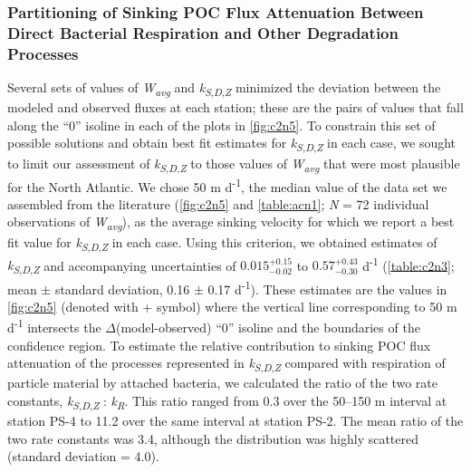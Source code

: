 \subsubsection{Partitioning of Sinking POC Flux Attenuation Between Direct Bacterial Respiration and Other Degradation Processes}
\label{sssec:Partitioning of Sinking POC Flux Attenuation Between Direct Bacterial Respiration and Other Degradation Processes}

Several sets of values of \emph{W\textsubscript{avg}} and \emph{k\textsubscript{S}}\textsubscript{,\emph{D},\emph{Z}} minimized the deviation between the modeled and observed fluxes at each station; these are the pairs of values that fall along the ``0'' isoline in each of the plots in \autoref{fig:c2n5}. To constrain this set of possible solutions and obtain best fit estimates for \emph{k\textsubscript{S}}\textsubscript{,\emph{D},\emph{Z}} in each case, we sought to limit our assessment of \emph{k\textsubscript{S}}\textsubscript{,\emph{D},\emph{Z}} to those values of \emph{W\textsubscript{avg}} that were most plausible for the North Atlantic. We chose 50 m d\textsuperscript{-1}, the median value of the data set we assembled from the literature (\autoref{fig:c2n5} and \autoref{table:acn1}; \emph{N} = 72 individual observations of \emph{W\textsubscript{avg}}), as the average sinking velocity for which we report a best fit value for \emph{k\textsubscript{S}}\textsubscript{,\emph{D},\emph{Z}} in each case. Using this criterion, we obtained estimates of \emph{k\textsubscript{S}}\textsubscript{,\emph{D},\emph{Z}} and accompanying uncertainties of $0.015_{ - 0.02}^{ + 0.15}$ to $0.57_{ - 0.30}^{ + 0.43}$ d\textsuperscript{-1} (\autoref{table:c2n3}; mean $\pm$ standard deviation, 0.16 $\pm$ 0.17 d\textsuperscript{-1}). These estimates are the values in \autoref{fig:c2n5} (denoted with + symbol) where the vertical line corresponding to 50 m d\textsuperscript{-1} intersects the $\Delta$(model-observed) ``0'' isoline and the boundaries of the confidence region. To estimate the relative contribution to sinking POC flux attenuation of the processes represented in \emph{k\textsubscript{S}}\textsubscript{,\emph{D},\emph{Z}} compared with respiration of particle material by attached bacteria, we calculated the ratio of the two rate constants, \emph{k\textsubscript{S}}\textsubscript{,\emph{D},\emph{Z}} : \emph{k\textsubscript{R}}. This ratio ranged from 0.3 over the 50--150 m interval at station PS-4 to 11.2 over the same interval at station PS-2. The mean ratio of the two rate constants was 3.4, although the distribution was highly scattered (standard deviation = 4.0).

